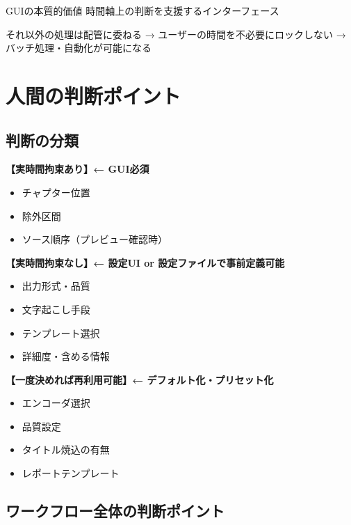 \documentclass[10pt,a4paper,twocolumn]{ltjsarticle}
\begin{document}
\begin{itembox}[l]{GUIの本質的価値}
時間軸上の判断を支援するインターフェース

それ以外の処理は配管に委ねる → ユーザーの時間を不必要にロックしない → バッチ処理・自動化が可能になる
\end{itembox}

\section{人間の判断ポイント}

\subsection{判断の分類}

\textbf{【実時間拘束あり】← GUI必須}
\begin{itemize}
\item チャプター位置
\item 除外区間
\item ソース順序（プレビュー確認時）
\end{itemize}

\textbf{【実時間拘束なし】← 設定UI or 設定ファイルで事前定義可能}
\begin{itemize}
\item 出力形式・品質
\item 文字起こし手段
\item テンプレート選択
\item 詳細度・含める情報
\end{itemize}

\textbf{【一度決めれば再利用可能】← デフォルト化・プリセット化}
\begin{itemize}
\item エンコーダ選択
\item 品質設定
\item タイトル焼込の有無
\item レポートテンプレート
\end{itemize}

\subsection{ワークフロー全体の判断ポイント}

\vspace{0.5\baselineskip}
\vspace{0.5\baselineskip}
\end{document}

